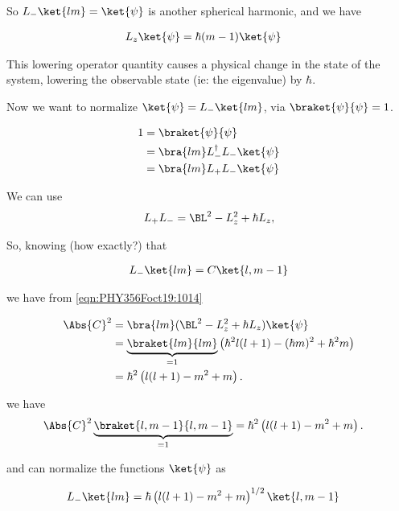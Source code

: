So $L_{-} \ket{lm} = \ket{\psi}$ is another spherical harmonic, and we have

\begin{align}\label{eqn:PHY356Foct19:1013}
L_z \ket{\psi} &= \hbar (m-1) \ket{\psi}
\end{align}

This lowering operator quantity causes a physical change in the state of the system, lowering the observable state (ie: the eigenvalue) by $\hbar$.

Now we want to normalize $\ket{\psi} = L_{-} \ket{lm}$, via $\braket{\psi}{\psi} = 1$.

\begin{align*}
1
&= \braket{\psi}{\psi} \\
&= \bra{lm} L_{-}^\dagger L_{-} \ket{\psi} \\
&= \bra{lm} L_{+} L_{-} \ket{\psi}
\end{align*}

We can use
\begin{align}\label{eqn:PHY356Foct19:1014}
L_{+} L_{-} = \BL^2 - L_z^2 + \hbar L_z,
\end{align}

So, knowing (how exactly?) that

\begin{align}\label{eqn:PHY356Foct19:1015}
L_{-} \ket{lm} = C \ket{l,m-1}
\end{align}

we have from \ref{eqn:PHY356Foct19:1014}

\begin{align*}
\Abs{C}^2
&= \bra{lm} (\BL^2 - L_z^2 + \hbar L_z ) \ket{\psi}  \\
&= \underbrace{\braket{lm}{lm}}_{=1} \left(\hbar^2 l(l+1) - (\hbar m)^2 + \hbar^2 m \right)  \\
&= \hbar^2 \left(l(l+1) - m^2 + m \right).
\end{align*}

we have
\begin{align}\label{eqn:PHY356Foct19:1016}
\Abs{C}^2 \underbrace{\braket{l,m-1}{l,m-1}}_{=1}
&= \hbar^2 \left(l(l+1) - m^2 + m \right).
\end{align}

and can normalize the functions $\ket{\psi}$ as

\begin{align}\label{eqn:PHY356Foct19:1017}
L_{-} \ket{lm} &= \hbar \left(l(l+1) - m^2 + m \right)^{1/2} \ket{l, m-1}
\end{align}

